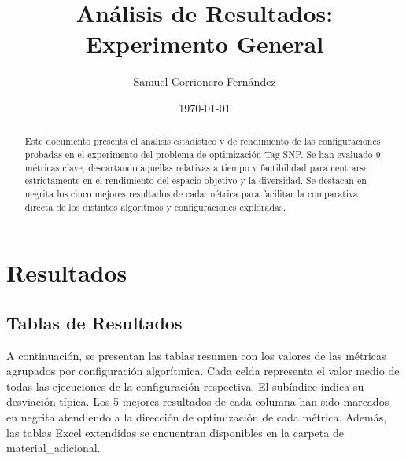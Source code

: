 \documentclass[11pt,a4paper]{article}
\title{Análisis de Resultados: Experimento General}
\author{Samuel Corrionero Fernández}
\date{\today}
\begin{document}
\maketitle

\begin{abstract}
Este documento presenta el análisis estadístico y de rendimiento de las configuraciones probadas en el experimento del problema de optimización Tag SNP. Se han evaluado 9 métricas clave, descartando aquellas relativas a tiempo y factibilidad para centrarse estrictamente en el rendimiento del espacio objetivo y la diversidad. Se destacan en negrita los cinco mejores resultados de cada métrica para facilitar la comparativa directa de los distintos algoritmos y configuraciones exploradas.
\end{abstract}

\tableofcontents
\newpage

\section{Resultados}
\subsection{Tablas de Resultados}
A continuación, se presentan las tablas resumen con los valores de las métricas agrupados por configuración algorítmica. Cada celda representa el valor medio de todas las ejecuciones de la configuración respectiva. El subíndice indica su desviación típica. Los 5 mejores resultados de cada columna han sido marcados en negrita atendiendo a la dirección de optimización de cada métrica. Además, las tablas Excel extendidas se encuentran disponibles en la carpeta de material\_adicional.
\end{document}
